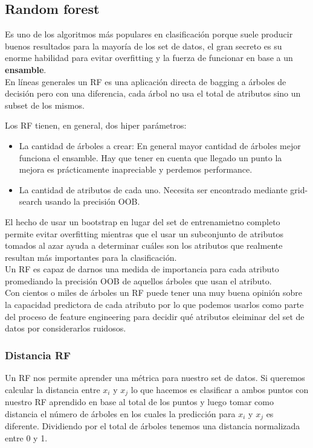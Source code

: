 \documentclass[titlepage,a4paper]{article}
\begin{document}
\subsection*{Random forest}
Es uno de los algoritmos más populares en clasificación porque suele producir buenos resultados para la mayoría de los set de datos, el gran secreto es su enorme habilidad para evitar overfitting y la fuerza de funcionar en base a un \textbf{ensamble}. \\

En líneas generales un RF es una aplicación directa de bagging a árboles de decisión pero con una diferencia, cada árbol no usa el total de atributos sino un subset de los mismos. 

Los RF tienen, en general, dos hiper parámetros: 
\begin{itemize}
\item La cantidad de árboles a crear: En general  mayor cantidad de árboles mejor funciona el ensamble. Hay que tener en cuenta que llegado un punto la mejora es prácticamente inapreciable y perdemos performance. 
\item La cantidad de atributos de cada uno. Necesita ser encontrado mediante grid-search usando la precisión OOB. 
\end{itemize}

El hecho de usar un bootstrap en lugar del set de entrenamietno completo permite evitar overfitting mientras que el usar un subconjunto de atributos tomados al azar ayuda a determinar cuáles son los atributos que realmente resultan más importantes para la clasificación. \\

Un RF es capaz de darnos una medida de importancia para cada atributo promediando la precisión OOB de aquellos árboles que usan el atributo. \\

Con cientos o miles de árboles un RF puede tener una muy buena opinión sobre la capacidad predictora de cada atributo por lo que podemos usarlos como parte del proceso de feature engineering para decidir qué atributos eleiminar del set de datos por considerarlos ruidosos. 

\subsubsection*{Distancia RF} 
Un RF nos permite aprender una métrica para nuestro set de datos. Si queremos calcular la distancia entre $x_i$ y $x_j$ lo que hacemos es clasificar a ambos puntos con nuestro RF aprendido en base al total de los puntos y luego tomar como distancia el número de árboles en los cuales la predicción para  $x_i$ y $x_j$ es diferente. Dividiendo por el total de árboles tenemos una distancia normalizada entre 0 y 1. 
\end{document}
